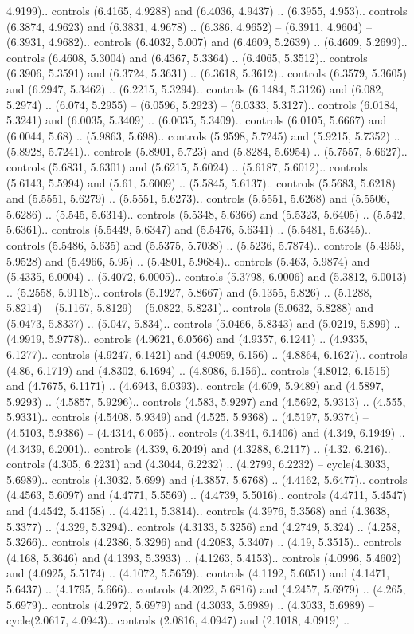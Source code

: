 4.9199).. controls (6.4165, 4.9288) and (6.4036, 4.9437) .. (6.3955, 4.953).. controls (6.3874, 4.9623) and (6.3831, 4.9678) .. (6.386, 4.9652) -- (6.3911, 4.9604) -- (6.3931, 4.9682).. controls (6.4032, 5.007) and (6.4609, 5.2639) .. (6.4609, 5.2699).. controls (6.4608, 5.3004) and (6.4367, 5.3364) .. (6.4065, 5.3512).. controls (6.3906, 5.3591) and (6.3724, 5.3631) .. (6.3618, 5.3612).. controls (6.3579, 5.3605) and (6.2947, 5.3462) .. (6.2215, 5.3294).. controls (6.1484, 5.3126) and (6.082, 5.2974) .. (6.074, 5.2955) -- (6.0596, 5.2923) -- (6.0333, 5.3127).. controls (6.0184, 5.3241) and (6.0035, 5.3409) .. (6.0035, 5.3409).. controls (6.0105, 5.6667) and (6.0044, 5.68) .. (5.9863, 5.698).. controls (5.9598, 5.7245) and (5.9215, 5.7352) .. (5.8928, 5.7241).. controls (5.8901, 5.723) and (5.8284, 5.6954) .. (5.7557, 5.6627).. controls (5.6831, 5.6301) and (5.6215, 5.6024) .. (5.6187, 5.6012).. controls (5.6143, 5.5994) and (5.61, 5.6009) .. (5.5845, 5.6137).. controls (5.5683, 5.6218) and (5.5551, 5.6279) .. (5.5551, 5.6273).. controls (5.5551, 5.6268) and (5.5506, 5.6286) .. (5.545, 5.6314).. controls (5.5348, 5.6366) and (5.5323, 5.6405) .. (5.542, 5.6361).. controls (5.5449, 5.6347) and (5.5476, 5.6341) .. (5.5481, 5.6345).. controls (5.5486, 5.635) and (5.5375, 5.7038) .. (5.5236, 5.7874).. controls (5.4959, 5.9528) and (5.4966, 5.95) .. (5.4801, 5.9684).. controls (5.463, 5.9874) and (5.4335, 6.0004) .. (5.4072, 6.0005).. controls (5.3798, 6.0006) and (5.3812, 6.0013) .. (5.2558, 5.9118).. controls (5.1927, 5.8667) and (5.1355, 5.826) .. (5.1288, 5.8214) -- (5.1167, 5.8129) -- (5.0822, 5.8231).. controls (5.0632, 5.8288) and (5.0473, 5.8337) .. (5.047, 5.834).. controls (5.0466, 5.8343) and (5.0219, 5.899) .. (4.9919, 5.9778).. controls (4.9621, 6.0566) and (4.9357, 6.1241) .. (4.9335, 6.1277).. controls (4.9247, 6.1421) and (4.9059, 6.156) .. (4.8864, 6.1627).. controls (4.86, 6.1719) and (4.8302, 6.1694) .. (4.8086, 6.156).. controls (4.8012, 6.1515) and (4.7675, 6.1171) .. (4.6943, 6.0393).. controls (4.609, 5.9489) and (4.5897, 5.9293) .. (4.5857, 5.9296).. controls (4.583, 5.9297) and (4.5692, 5.9313) .. (4.555, 5.9331).. controls (4.5408, 5.9349) and (4.525, 5.9368) .. (4.5197, 5.9374) -- (4.5103, 5.9386) -- (4.4314, 6.065).. controls (4.3841, 6.1406) and (4.349, 6.1949) .. (4.3439, 6.2001).. controls (4.339, 6.2049) and (4.3288, 6.2117) .. (4.32, 6.216).. controls (4.305, 6.2231) and (4.3044, 6.2232) .. (4.2799, 6.2232) -- cycle(4.3033, 5.6989).. controls (4.3032, 5.699) and (4.3857, 5.6768) .. (4.4162, 5.6477).. controls (4.4563, 5.6097) and (4.4771, 5.5569) .. (4.4739, 5.5016).. controls (4.4711, 5.4547) and (4.4542, 5.4158) .. (4.4211, 5.3814).. controls (4.3976, 5.3568) and (4.3638, 5.3377) .. (4.329, 5.3294).. controls (4.3133, 5.3256) and (4.2749, 5.324) .. (4.258, 5.3266).. controls (4.2386, 5.3296) and (4.2083, 5.3407) .. (4.19, 5.3515).. controls (4.168, 5.3646) and (4.1393, 5.3933) .. (4.1263, 5.4153).. controls (4.0996, 5.4602) and (4.0925, 5.5174) .. (4.1072, 5.5659).. controls (4.1192, 5.6051) and (4.1471, 5.6437) .. (4.1795, 5.666).. controls (4.2022, 5.6816) and (4.2457, 5.6979) .. (4.265, 5.6979).. controls (4.2972, 5.6979) and (4.3033, 5.6989) .. (4.3033, 5.6989) -- cycle(2.0617, 4.0943).. controls (2.0816, 4.0947) and (2.1018, 4.0919) .. 